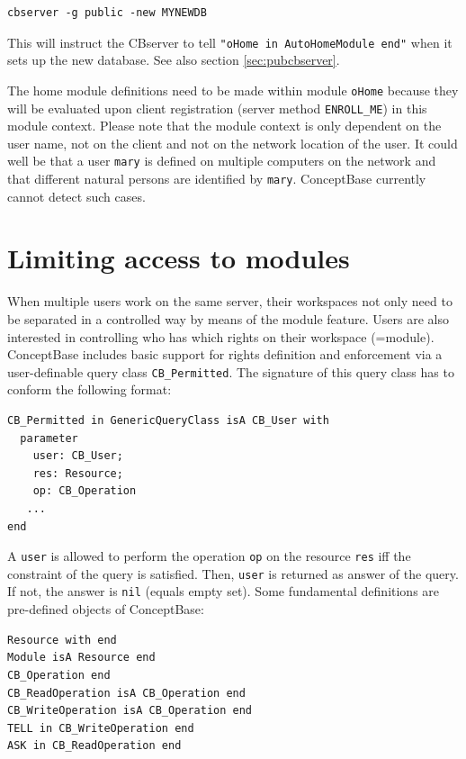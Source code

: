 \begin{verbatim}
cbserver -g public -new MYNEWDB
\end{verbatim}

This will instruct the CBserver to tell {\tt "oHome in AutoHomeModule end"}
when it sets up the new database. See also section \ref{sec:pubcbserver}.


The home module definitions need to be made within module {\tt oHome} because
they will be evaluated upon client registration (server method {\tt ENROLL\_ME})
in this module context.
Please note that the module context is only dependent on the user name,
not on the client and not on the network location of the user.
It could well be that a user {\tt mary} is defined on multiple
computers on the network and that different natural persons are
identified by {\tt mary}. ConceptBase currently cannot detect such cases.


\section{Limiting access to modules}
\label{sec:modaccess}

When multiple users work on the same server, their workspaces not only need to be separated
in a controlled way by means of the module feature. Users are also interested in controlling who
has which rights on their workspace (=module). ConceptBase includes basic support for 
rights definition and enforcement via a user-definable query class {\tt CB\_Permitted}.
The signature of this query class has to conform the following format:

\begin{verbatim}
CB_Permitted in GenericQueryClass isA CB_User with
  parameter
    user: CB_User;
    res: Resource;
    op: CB_Operation
   ...
end
\end{verbatim}

A {\tt user} is allowed to perform the operation {\tt op} on the resource {\tt res}
iff the constraint of the query is satisfied. Then, {\tt user} is returned as answer
of the query. If not, the answer is {\tt nil} (equals empty set). 
Some fundamental definitions are pre-defined objects of ConceptBase:


\begin{verbatim}
Resource with end  
Module isA Resource end  
CB_Operation end   
CB_ReadOperation isA CB_Operation end  
CB_WriteOperation isA CB_Operation end
TELL in CB_WriteOperation end
ASK in CB_ReadOperation end   
\end{verbatim}

